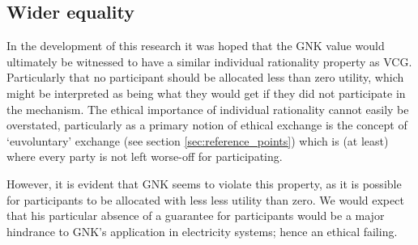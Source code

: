 


\subsection{Wider equality}

In the development of this research it was hoped that the GNK value would ultimately be witnessed to have a similar individual rationality property as VCG.
Particularly that no participant should be allocated less than zero utility, which might be interpreted as being what they would get if they did not participate in the mechanism.
The ethical importance of individual rationality cannot easily be overstated, particularly as a primary notion of ethical exchange is the concept of `euvoluntary' exchange (see section \ref{sec:reference_points}) which is (at least) where every party is not left worse-off for participating.

However, it is evident that GNK seems to violate this property, as it is possible for participants to be allocated with less less utility than zero.
We would expect that his particular absence of a guarantee for participants would be a major hindrance to GNK's application in electricity systems; hence an ethical failing.

